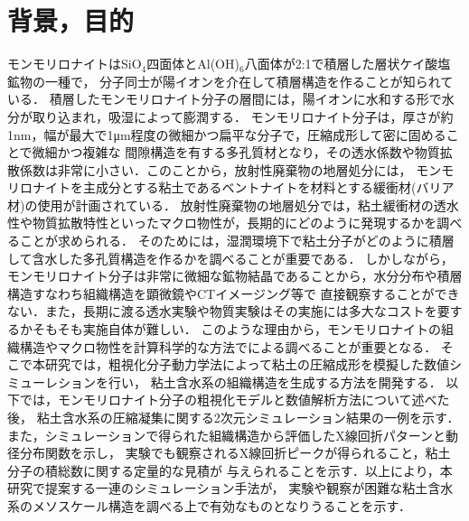 ﻿\documentclass[11pt,a4j]{jarticle}
\begin{document}
\section{背景，目的}
モンモリロナイトはSiO$_4$四面体とAl(OH)$_6$八面体が2:1で積層した層状ケイ酸塩鉱物の一種で，
分子同士が陽イオンを介在して積層構造を作ることが知られている．
積層したモンモリロナイト分子の層間には，陽イオンに水和する形で水分が取り込まれ，吸湿によって膨潤する．
モンモリロナイト分子は，厚さが約1nm，幅が最大で1μm程度の微細かつ扁平な分子で，圧縮成形して密に固めることで微細かつ複雑な
間隙構造を有する多孔質材となり，その透水係数や物質拡散係数は非常に小さい．このことから，放射性廃棄物の地層処分には，
モンモリロナイトを主成分とする粘土であるベントナイトを材料とする緩衝材(バリア材)の使用が計画されている．
放射性廃棄物の地層処分では，粘土緩衝材の透水性や物質拡散特性といったマクロ物性が，長期的にどのように発現するかを調べることが求められる．
そのためには，湿潤環境下で粘土分子がどのように積層して含水した多孔質構造を作るかを調べることが重要である．
しかしながら，モンモリロナイト分子は非常に微細な鉱物結晶であることから，水分分布や積層構造すなわち組織構造を顕微鏡やCTイメージング等で
直接観察することができない．また，長期に渡る透水実験や物質実験はその実施には多大なコストを要するかそもそも実施自体が難しい．
このような理由から，モンモリロナイトの組織構造やマクロ物性を計算科学的な方法でによる調べることが重要となる．
そこで本研究では，粗視化分子動力学法によって粘土の圧縮成形を模擬した数値シミューレションを行い，
粘土含水系の組織構造を生成する方法を開発する．
以下では，モンモリロナイト分子の粗視化モデルと数値解析方法について述べた後，
粘土含水系の圧縮凝集に関する2次元シミュレーション結果の一例を示す．
また，シミュレーションで得られた組織構造から評価したX線回折パターンと動径分布関数を示し，
実験でも観察されるX線回折ピークが得られること，粘土分子の積総数に関する定量的な見積が
与えられることを示す．以上により，本研究で提案する一連のシミュレーション手法が，
実験や観察が困難な粘土含水系のメソスケール構造を調べる上で有効なものとなりうることを示す．
\end{document}
